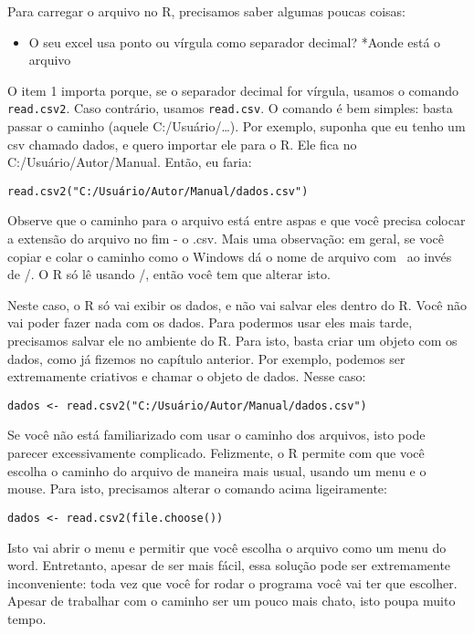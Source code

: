 \documentclass[
]{book}
\providecommand{\tightlist}{%
  \setlength{\itemsep}{0pt}\setlength{\parskip}{0pt}}
\begin{document}
Para carregar o arquivo no R, precisamos saber algumas poucas coisas:

\begin{itemize}
\tightlist
\item
  O seu excel usa ponto ou vírgula como separador decimal?
  *Aonde está o arquivo
\end{itemize}

O item 1 importa porque, se o separador decimal for vírgula, usamos o comando \texttt{read.csv2}. Caso contrário, usamos \texttt{read.csv}. O comando é bem simples: basta passar o caminho (aquele C:/Usuário/\ldots). Por exemplo, suponha que eu tenho um csv chamado dados, e quero importar ele para o R. Ele fica no C:/Usuário/Autor/Manual. Então, eu faria:

\begin{verbatim}
read.csv2("C:/Usuário/Autor/Manual/dados.csv")
\end{verbatim}

Observe que o caminho para o arquivo está entre aspas e que você precisa colocar a extensão do arquivo no fim - o .csv. Mais uma observação: em geral, se você copiar e colar o caminho como o Windows dá o nome de arquivo com ~ao invés de /. O R só lê usando /, então você tem que alterar isto.

Neste caso, o R só vai exibir os dados, e não vai salvar eles dentro do R. Você não vai poder fazer nada com os dados. Para podermos usar eles mais tarde, precisamos salvar ele no ambiente do R. Para isto, basta criar um objeto com os dados, como já fizemos no capítulo anterior. Por exemplo, podemos ser extremamente criativos e chamar o objeto de dados. Nesse caso:

\begin{verbatim}
dados <- read.csv2("C:/Usuário/Autor/Manual/dados.csv")
\end{verbatim}

Se você não está familiarizado com usar o caminho dos arquivos, isto pode parecer excessivamente complicado. Felizmente, o R permite com que você escolha o caminho do arquivo de maneira mais usual, usando um menu e o mouse. Para isto, precisamos alterar o comando acima ligeiramente:

\begin{verbatim}
dados <- read.csv2(file.choose())
\end{verbatim}

Isto vai abrir o menu e permitir que você escolha o arquivo como um menu do word. Entretanto, apesar de ser mais fácil, essa solução pode ser extremamente inconveniente: toda vez que você for rodar o programa você vai ter que escolher. Apesar de trabalhar com o caminho ser um pouco mais chato, isto poupa muito tempo.
\end{document}
